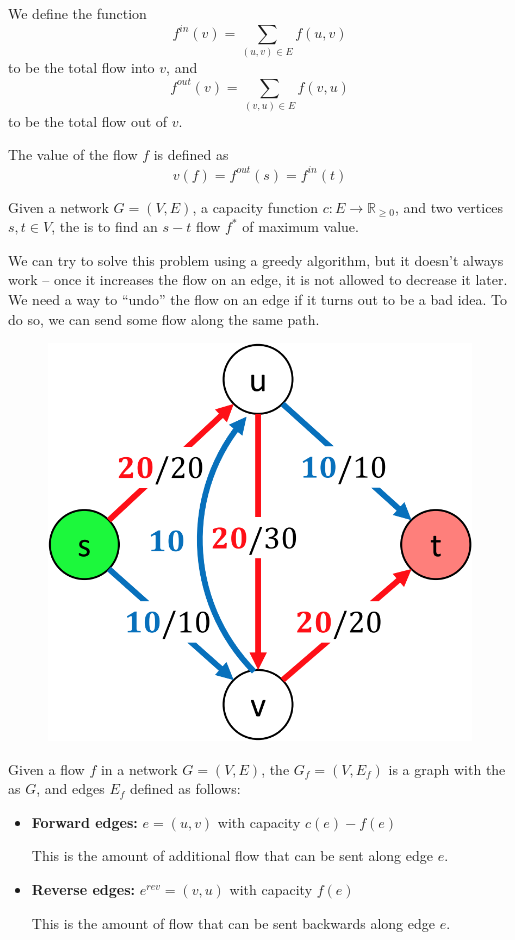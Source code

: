 \begin{remark}[Notation]
    We define the function \[
        f^{in}(v) = \sum_{(u, v) \in E} f(u, v)
    \] to be the total flow into $v$, and \[
        f^{out}(v) = \sum_{(v, u) \in E} f(v, u)
    \] to be the total flow out of $v$.
\end{remark}

The value of the flow $f$ is defined as \[
    v(f) = f^{out}(s) = f^{in}(t)
\]

\begin{definition}\label{def:network-flow-problem}
    Given a network $G = (V, E)$, a capacity function $c: E \to \mathbb{R}_{\ge0}$, and two vertices $s, t \in V$, the  is to find an $s-t$ flow $f^*$ of maximum value.
\end{definition}

We can try to solve this problem using a greedy algorithm, but it doesn't always work -- once it increases the flow on an edge, it is not allowed to decrease it later. We need a way to ``undo'' the flow on an edge if it turns out to be a bad idea. To do so, we can send some flow  along the same path.

\begin{figure}[ht!]
    \centering
    \includegraphics[width=0.25\linewidth]{figures/reverse-flow.png}
\end{figure}

\begin{definition}\label{def:residual-graph}
    Given a flow $f$ in a network $G = (V, E)$, the  $G_f = (V, E_f)$ is a graph with the  as $G$, and edges $E_f$ defined as follows:
    \begin{itemize}
        \item \textbf{Forward edges:} $e = (u, v)$ with capacity $c(e) - f(e)$
        
        This is the amount of additional flow that can be sent along edge $e$.

        \item \textbf{Reverse edges:} $e^{rev} = (v, u)$ with capacity $f(e)$
        
        This is the amount of flow that can be sent backwards along edge $e$.
    \end{itemize}
\end{definition}

